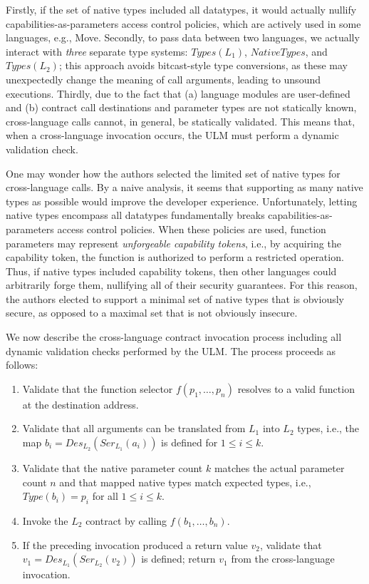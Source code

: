 \documentclass{article}
\newcommand{\ulm}{{ULM}}
\begin{document}
Firstly, if the set of native types included all datatypes, it would actually nullify capabilities-as-parameters access control policies, which are actively used in some languages, e.g., Move.
Secondly, to pass data between two languages, we actually interact with \emph{three} separate type systems: $Types(L_1)$, $NativeTypes$, and $Types(L_2)$;
this approach avoids bitcast-style type conversions, as these may unexpectedly change the meaning of call arguments, leading to unsound executions.
Thirdly, due to the fact that (a) language modules are user-defined and (b) contract call destinations and parameter types are not statically known, cross-language calls cannot, in general, be statically validated.
This means that, when a cross-language invocation occurs, the \ulm{} must perform a dynamic validation check.

One may wonder how the authors selected the limited set of native types for cross-language calls.
By a naive analysis, it seems that supporting as many native types as possible would improve the developer experience.
Unfortunately, letting native types encompass all datatypes fundamentally breaks capabilities-as-parameters access control policies.
When these policies are used, function parameters may represent \emph{unforgeable capability tokens}, i.e., by acquiring the capability token, the function is authorized to perform a restricted operation.
Thus, if native types included capability tokens, then other languages could arbitrarily forge them, nullifying all of their security guarantees.
For this reason, the authors elected to support a minimal set of native types that is obviously secure, as opposed to a maximal set that is not obviously insecure.

We now describe the cross-language contract invocation process including all dynamic validation checks performed by the \ulm{}.
The process proceeds as follows:

\begin{enumerate}
    \item Validate that the function selector $f(p_1,\ldots,p_n)$ resolves to a valid function at the destination address.
    \item Validate that all arguments can be translated from $L_1$ into $L_2$ types, i.e., the map $b_i = Des_{L_2}(Ser_{L_1}(a_i))$ is defined for $1\leq i\leq k$.
    \item Validate that the native parameter count $k$ matches the actual parameter count $n$ and that mapped native types match expected types, i.e., $Type(b_i) = p_i$ for all $1\leq i\leq k$. 
    \item Invoke the $L_2$ contract by calling $f(b_1,\ldots,b_n)$.
    \item If the preceding invocation produced a return value $v_2$, validate that $v_1=Des_{L_1}(Ser_{L_2}(v_2))$ is defined; return $v_1$ from the cross-language invocation.
\end{enumerate}
\end{document}
